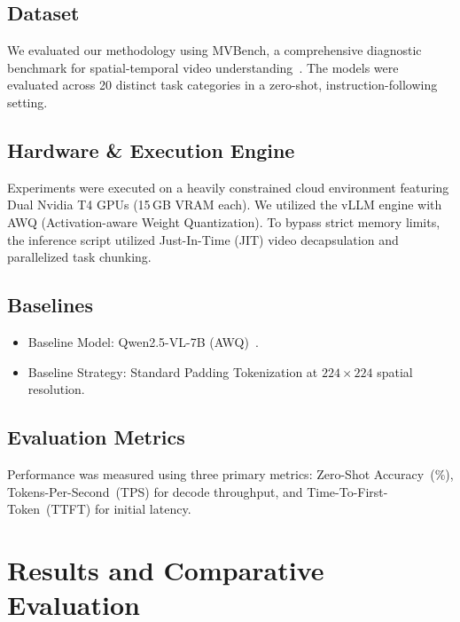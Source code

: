 \documentclass[conference]{IEEEtran}
\begin{document}
\subsection{Dataset}
We evaluated our methodology using MVBench, a comprehensive diagnostic
benchmark for spatial-temporal video understanding~\cite{mvbench}.
The models were evaluated across 20 distinct task categories in a zero-shot,
instruction-following setting.

\subsection{Hardware \& Execution Engine}
Experiments were executed on a heavily constrained cloud environment featuring
Dual Nvidia T4 GPUs (15\,GB VRAM each).
We utilized the vLLM engine with AWQ (Activation-aware Weight Quantization).
To bypass strict memory limits, the inference script utilized Just-In-Time
(JIT) video decapsulation and parallelized task chunking.

\subsection{Baselines}
\begin{itemize}
  \item Baseline Model: Qwen2.5-VL-7B (AWQ)~\cite{qwenvl}.
  \item Baseline Strategy: Standard Padding Tokenization at
    $224\!\times\!224$ spatial resolution.
\end{itemize}

\subsection{Evaluation Metrics}
Performance was measured using three primary metrics:
Zero-Shot Accuracy~(\%),
Tokens-Per-Second~(TPS) for decode throughput, and
Time-To-First-Token~(TTFT) for initial latency.

\section{Results and Comparative Evaluation}
\end{document}
